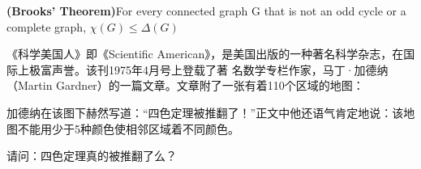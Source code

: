 \documentclass[a4paper, justified]{tufte-handout}
\begin{document}
\begin{ot}[请证明Brooks定理]
  \textbf{(Brooks’ Theorem)}For every connected graph G that is not an odd cycle or a
  complete graph, $\chi(G) \le \Delta(G)$
\end{ot}


\begin{ot}
  《科学美国人》即《Scientific American》，是美国出版的一种著名科学杂志，在国际上极富声誉。该刊1975年4月号上登载了著
  名数学专栏作家，马丁·加德纳（Martin Gardner）的一篇文章。文章附了一张有着110个区域的地图：

  加德纳在该图下赫然写道：“四色定理被推翻了！”正文中他还语气肯定地说：该地图不能用少于5种颜色使相邻区域着不同颜色。

  请问：四色定理真的被推翻了么？
\end{ot}





% 




\beginfb

% 
% 
\end{document}
